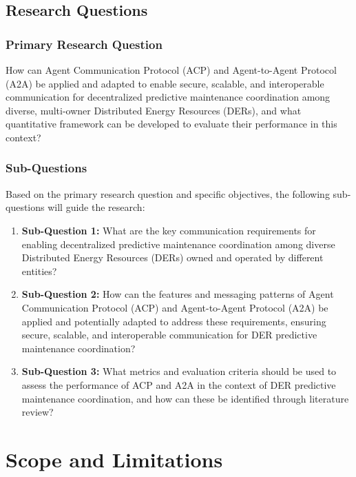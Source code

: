 \subsection{Research Questions}

\subsubsection{Primary Research Question}

How can Agent Communication Protocol (ACP) and Agent-to-Agent Protocol (A2A) be applied and adapted to enable secure, scalable, and interoperable communication for decentralized predictive maintenance coordination among diverse, multi-owner Distributed Energy Resources (DERs), and what quantitative framework can be developed to evaluate their performance in this context?

\subsubsection{Sub-Questions}

Based on the primary research question and specific objectives, the following sub-questions will guide the research:

\begin{enumerate}
    \item \textbf{Sub-Question 1:} What are the key communication requirements for enabling decentralized predictive maintenance coordination among diverse Distributed Energy Resources (DERs) owned and operated by different entities?
    
    \item \textbf{Sub-Question 2:} How can the features and messaging patterns of Agent Communication Protocol (ACP) and Agent-to-Agent Protocol (A2A) be applied and potentially adapted to address these requirements, ensuring secure, scalable, and interoperable communication for DER predictive maintenance coordination?
    
    \item \textbf{Sub-Question 3:} What metrics and evaluation criteria should be used to assess the performance of ACP and A2A in the context of DER predictive maintenance coordination, and how can these be identified through literature review?
\end{enumerate}


\section{Scope and Limitations}
\label{sec:scope}

